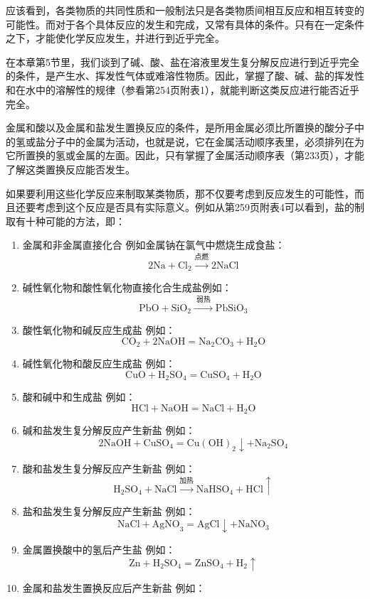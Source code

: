应该看到，各类物质的共同性质和一般制法只是各类物质间相互反应和相互转变的可能性。而对于各个具体反应的发生和完成，又常有具体的条件。只有在一定条件之下，才能使化学反应发生，并进行到近乎完全。

在本章第5节里，我们谈到了碱、酸、盐在溶液里发生复分解反应进行到近乎完全的条件，是产生水、挥发性气体或难溶性物质。因此，掌握了酸、碱、盐的挥发性和在水中的溶解性的规律（参看第254页附表1），就能判断这类反应进行能否近乎完全。

金属和酸以及金属和盐发生置换反应的条件，是所用金属必须比所置换的酸分子中的氢或盐分子中的金属为活动，也就是说，它在金属活动顺序表里，必须排列在为它所置换的氢或金属的左面。因此，只有掌握了金属活动顺序表（第233页），才能了解这类置换反应能否发生。

如果要利用这些化学反应来制取某类物质，那不仅要考虑到反应发生的可能性，而且还要考虑到这个反应是否具有实际意义。例如从第259页附表4可以看到，盐的制取有十种可能的方法，即：

\begin{enumerate}
\item
  金属和非金属直接化合 例如金属钠在氯气中燃烧生成食盐：
\[
2 \mathrm{Na} + \mathrm{Cl}_{2} \xrightarrow {\text{点燃}} 2 \mathrm{NaCl}
\]
\item
  碱性氧化物和酸性氧化物直接化合生成盐例如：
\[
\mathrm{PbO} + \mathrm{SiO}_{2} \xrightarrow {\text{ 弱热 }} \mathrm{PbSiO}_{3}
\]
\item
  酸性氧化物和碱反应生成盐 例如：
\[
\mathrm{CO}_{2} + 2 \mathrm{NaOH} = \mathrm{Na}_{2} \mathrm{CO}_{3} + \mathrm{H}_{2} \mathrm{O}
\]
\item
  碱性氧化物和酸反应生成盐 例如：
\[
\mathrm{CuO} + \mathrm{H}_{2} \mathrm{SO}_{4} = \mathrm{CuSO}_{4} + \mathrm{H}_{2} \mathrm{O}
\]
\item
  酸和碱中和生成盐 例如：
\[
\mathrm{HCl} + \mathrm{NaOH} = \mathrm{NaCl} + \mathrm{H}_{2} \mathrm{O}
\]
\item
  碱和盐发生复分解反应产生新盐 例如：
\[
2\mathrm{NaOH}+\mathrm{CuSO}_{4}=\mathrm{Cu(OH)}_{2}\downarrow+\mathrm{Na}_{2}\mathrm{SO}_{4}
\]
\item
  酸和盐发生复分解反应产生新盐 例如：
\[
\mathrm{H}_{2} \mathrm{SO}_{4} + \mathrm{NaCl} \xrightarrow {\text{加热}} \mathrm{NaHSO}_{4} + \mathrm{HCl} \uparrow
\]
\item
  盐和盐发生复分解反应产生新盐 例如：
\[
\mathrm{NaCl} + \mathrm{AgNO}_{3} = \mathrm{AgCl} \downarrow + \mathrm{NaNO}_{3}
\]
\item
  金属置换酸中的氢后产生盐 例如：
\[
\mathrm{Zn} + \mathrm{H}_{2} \mathrm{SO}_{4} = \mathrm{ZnSO}_{4} + \mathrm{H}_{2} \uparrow
\]
\item
  金属和盐发生置换反应后产生新盐 例如：
\end{enumerate}

